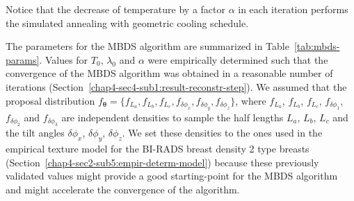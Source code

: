 \documentclass[journal]{IEEEtran}
\begin{document}
\setcounter{table}{0}

Notice that the decrease of temperature by a factor $\alpha$ in each
iteration performs the simulated annealing
\cite{kirkpatrick1983optimization} with geometric cooling schedule.

The parameters for the MBDS algorithm are summarized in
Table~\ref{tab:mbds-params}. Values for $T_0$, $\lambda_0$ and
$\alpha$ were empirically determined such that the convergence of the
MBDS algorithm was obtained in a reasonable number of iterations
(Section~\ref{chap4-sec4-sub1:result-reconstr-step}). We assumed that
the proposal distribution
$f_{\boldsymbol{\theta}} = \{ f_{L_a}, f_{L_b}, f_{L_c},
f_{\delta{\phi_x}}, f_{\delta{\phi_y}}, f_{\delta{\phi_z}} \}$, where
$f_{L_a}$, $f_{L_b}$, $f_{L_c}$, $f_{\delta{\phi_1}}$,
$f_{\delta{\phi_2}}$ and $f_{\delta{\phi_3}}$ are independent
densities to sample the half lengths $L_a$, $L_b$, $L_c$ and the tilt
angles $\delta{\phi_x}$, $\delta{\phi_y}$, $\delta{\phi_z}$.  We set
these densities to the ones used in the empirical texture model for
the BI-RADS breast density 2 type breasts
(Section~\ref{chap4-sec2-sub5:empir-determ-model}) because these
previously validated values might provide a good starting-point for
the MBDS algorithm and might accelerate the convergence of the
algorithm.
\end{document}
